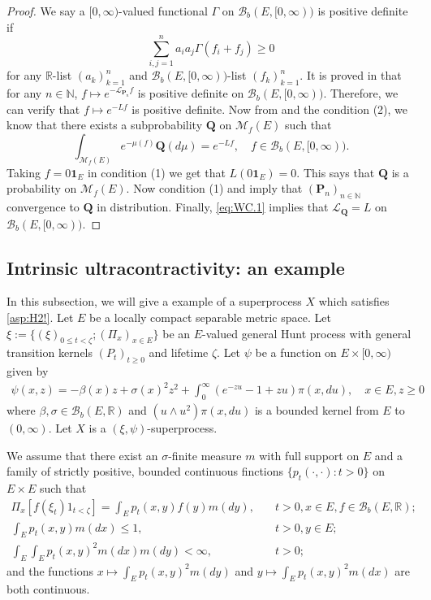 \documentclass[12pt,a4paper]{amsart}
\numberwithin{equation}{section}
\theoremstyle{plain}
\theoremstyle{definition}
\theoremstyle{remark}
\begin{document}
\begin{proof}
	We say a $[0,\infty)$-valued functional $\Gamma$ on $\mathcal B_b(E,[0,\infty))$ is positive definite if \[\sum_{i,j =1}^n a_i a_j \Gamma (f_i + f_j)\geq 0\] for any $\mathbb R$-list $(a_k)_{k = 1}^n$ and $\mathcal B_b(E,[0,\infty))$-list $(f_k)_{k = 1}^n$.
	It is proved in \cite[Theorem 3.3.3]{Dawson1992Infinitely} that for any $n \in \mathbb N$, $f\mapsto e^{- \mathscr L_{\mathbf P_n}f}$ is positive definite on $\mathcal B_b(E,[0,\infty))$.
	Therefore, we can verify that $f \mapsto e^{- L f}$ is positive definite.
	Now from \cite[Corollary (A.6)]{Fitzsimmons1989Construction} and the condition (2), we know that there exists a subprobability $\mathbf Q$ on $\mathcal M_f(E)$ such that
\begin{equation}	\label{eq:WC.1}
	\int_{\mathcal M_f(E)}e^{-\mu(f) } \mathbf Q(d\mu) = e^{-Lf}, \quad f \in \mathcal B_b(E,[0,\infty)).
\end{equation}
	Taking $f = 0\mathbf 1_E$ in condition (1) we get that $L(0 \mathbf 1_E) = 0$.
	This says that $\mathbf Q$ is a probability on $\mathcal M_f(E)$.
	Now condition (1) and \cite[Theorem 1.8]{Li2011MeasureValued} imply that $(\mathbf P_n)_{n \in \mathbb N}$ convergence to $\mathbf Q$ in distribution. 
	Finally, \eqref{eq:WC.1} implies that $\mathscr L_{\mathbf Q} = L$ on $\mathcal B_b(E,[0,\infty))$. 
\end{proof}

\subsection{Intrinsic ultracontractivity: an example}
	In this subsection, we will give a example of a superprocess $X$ which satisfies \eqref{asp:H2!}.
	Let $E$ be a locally compact separable metric space.
	Let $\xi:= \{(\xi)_{0\leq t < \zeta}; (\Pi_x)_{x\in E}\}$ be an $E$-valued general Hunt process with general transition kernels $(P_t)_{t\geq 0}$ and lifetime $\zeta$.
	Let $\psi$ be a function on $E \times [0,\infty)$ given by
\begin{align}
	\psi(x,z)
	=- \beta(x) z + \sigma(x)^2 z^2 + \int_0^\infty (e^{-zu} -1 + zu) \pi(x,du),
	\quad x\in E, z\geq 0
\end{align}
	where $\beta, \sigma \in \mathcal B_b(E,\mathbb R)$ and $(u \wedge u^2) \pi(x,du)$ is a bounded kernel from $E$ to $(0,\infty)$.
	Let $X$ is a $(\xi, \psi)$-superprocess.

	We assume  that there exist an $\sigma$-finite measure $m$ with full support on $E$ and a family of strictly positive, bounded continuous finctions $\{p_t(\cdot,\cdot): t>0\}$ on $E\times E$ such that
\begin{align}
	\Pi_x[f(\xi_t) 1_{t< \zeta}] = \int_E p_t(x,y) f(y)m(dy), & \quad t>0, x\in E, f\in \mathcal B_b(E,\mathbb R);
	\\ \int_E p_t(x,y) m(dx) \leq 1, &\quad t>0, y\in E;
	\\ \int_E \int_E p_t(x,y)^2 m(dx)m(dy) < \infty, &\quad t>0;
\end{align}
	and the functions $x \mapsto \int_E p_t(x,y)^2m(dy)$ and $y\mapsto \int_E p_t(x,y)^2m(dx)$ are both continuous.
\end{document}
